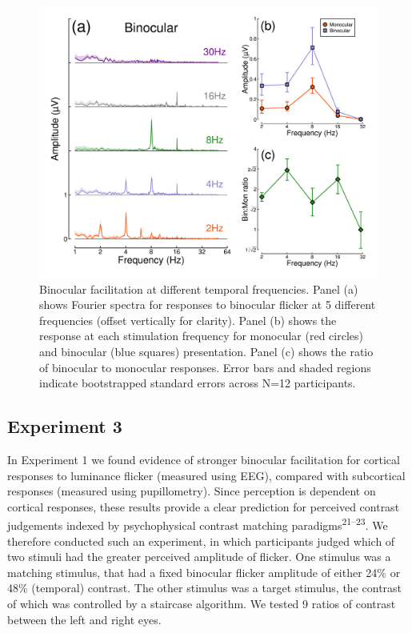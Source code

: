 \documentclass[
]{article}
\begin{document}
\begin{figure}

{\centering \includegraphics{Figures/TFdata} 

}

\caption{Binocular facilitation at different temporal frequencies. Panel (a) shows Fourier spectra for responses to binocular flicker at 5 different frequencies (offset vertically for clarity). Panel (b) shows the response at each stimulation frequency for monocular (red circles) and binocular (blue squares) presentation. Panel (c) shows the ratio of binocular to monocular responses. Error bars and shaded regions indicate bootstrapped standard errors across N=12 participants.}\label{fig:TFdata}
\end{figure}

\hypertarget{experiment-3}{%
\subsection{Experiment 3}\label{experiment-3}}

In Experiment 1 we found evidence of stronger binocular facilitation for cortical responses to luminance flicker (measured using EEG), compared with subcortical responses (measured using pupillometry). Since perception is dependent on cortical responses, these results provide a clear prediction for perceived contrast judgements indexed by psychophysical contrast matching paradigms\textsuperscript{21--23}. We therefore conducted such an experiment, in which participants judged which of two stimuli had the greater perceived amplitude of flicker. One stimulus was a matching stimulus, that had a fixed binocular flicker amplitude of either 24\% or 48\% (temporal) contrast. The other stimulus was a target stimulus, the contrast of which was controlled by a staircase algorithm. We tested 9 ratios of contrast between the left and right eyes.
\end{document}
